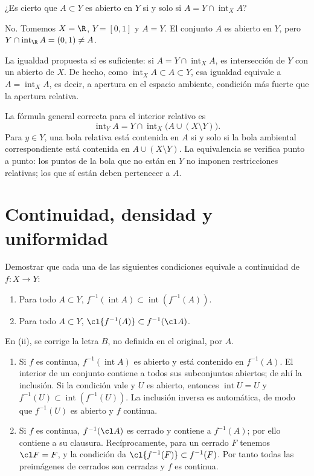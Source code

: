 \begin{ejercicio}\label{ej:lectura-4-6}
¿Es cierto que $A\subset Y$ es abierto en $Y$ si y solo si $A=Y\cap\operatorname{int}_X A$?
\end{ejercicio}
\begin{solucion}
No. Tomemos $X=\R$, $Y=[0,1]$ y $A=Y$. El conjunto $A$ es abierto en $Y$, pero $Y\cap\operatorname{int}_{\R}A=(0,1)\ne A$.

La igualdad propuesta sí es suficiente: si $A=Y\cap\operatorname{int}_X A$, es intersección de $Y$ con un abierto de $X$. De hecho, como $\operatorname{int}_X A\subset A\subset Y$, esa igualdad equivale a $A=\operatorname{int}_X A$, es decir, a apertura en el espacio ambiente, condición más fuerte que la apertura relativa.

La fórmula general correcta para el interior relativo es
\[
\operatorname{int}_Y A
=Y\cap\operatorname{int}_X\bigl(A\cup(X\setminus Y)\bigr).
\]
Para $y\in Y$, una bola relativa está contenida en $A$ si y solo si la bola ambiental correspondiente está contenida en $A\cup(X\setminus Y)$. La equivalencia se verifica punto a punto: los puntos de la bola que no están en $Y$ no imponen restricciones relativas; los que sí están deben pertenecer a $A$.
\end{solucion}

\chapter{Continuidad, densidad y uniformidad}

\begin{ejercicio}\label{ej:lectura-5-1}
Demostrar que cada una de las siguientes condiciones equivale a continuidad de $f:X\to Y$:
\begin{enumerate}[label=(\roman*)]
\item Para todo $A\subset Y$, $f^{-1}(\operatorname{int}A)\subset\operatorname{int}(f^{-1}(A))$.
\item Para todo $A\subset Y$, $\cl{f^{-1}(A)}\subset f^{-1}(\cl A)$.
\end{enumerate}
En (ii), se corrige la letra $B$, no definida en el original, por $A$.
\end{ejercicio}
\begin{solucion}
\begin{enumerate}[label=(\roman*)]
\item Si $f$ es continua, $f^{-1}(\operatorname{int}A)$ es abierto y está contenido en $f^{-1}(A)$. El interior de un conjunto contiene a todos sus subconjuntos abiertos; de ahí la inclusión. Si la condición vale y $U$ es abierto, entonces $\operatorname{int}U=U$ y $f^{-1}(U)\subset\operatorname{int}(f^{-1}(U))$. La inclusión inversa es automática, de modo que $f^{-1}(U)$ es abierto y $f$ continua.
\item Si $f$ es continua, $f^{-1}(\cl A)$ es cerrado y contiene a $f^{-1}(A)$; por ello contiene a su clausura. Recíprocamente, para un cerrado $F$ tenemos $\cl F=F$, y la condición da $\cl{f^{-1}(F)}\subset f^{-1}(F)$. Por tanto todas las preimágenes de cerrados son cerradas y $f$ es continua.
\end{enumerate}
\end{solucion}

